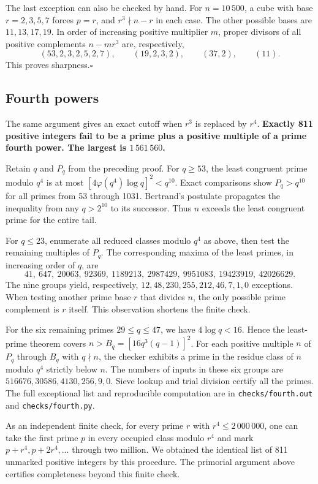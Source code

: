 The last exception can also be checked by hand. For $n=10\,500$, a cube with base $r=2,3,5,7$ forces $p=r$, and $r^3\nmid n-r$ in each case. The other possible bases are $11,13,17,19$. In order of increasing positive multiplier $m$, proper divisors of all positive complements $n-mr^3$ are, respectively,
\[
(53,2,3,2,5,2,7),\qquad(19,2,3,2),\qquad(37,2),\qquad(11).
\]
This proves sharpness.\hfill$\square$
\subsection*{Fourth powers}
The same argument gives an exact cutoff when $r^3$ is replaced by $r^4$.
\textbf{Exactly 811 positive integers fail to be a prime plus a positive multiple of a prime fourth power. The largest is $1\,561\,560$.}

Retain $q$ and $P_q$ from the preceding proof. For $q\ge53$, the least congruent prime modulo $q^4$ is at most $[4\varphi(q^4)\log q]^2<q^{10}$. Exact comparisons show $P_q>q^{10}$ for all primes from 53 through 1031. Bertrand's postulate propagates the inequality from any $q>2^{10}$ to its successor. Thus $n$ exceeds the least congruent prime for the entire tail.

For $q\le23$, enumerate all reduced classes modulo $q^4$ as above, then test the remaining multiples of $P_q$. The corresponding maxima of the least primes, in increasing order of $q$, are
\[
 41,\ 647,\ 20063,\ 92369,\ 1189213,\ 2987429,\ 9951083,\ 19423919,\ 42026629.
\]
The nine groups yield, respectively, $12,48,230,255,212,46,7,1,0$ exceptions. When testing another prime base $r$ that divides $n$, the only possible prime complement is $r$ itself. This observation shortens the finite check.

For the six remaining primes $29\le q\le47$, we have $4\log q<16$. Hence the least-prime theorem covers $n>B_q=[16q^3(q-1)]^2$. For each positive multiple $n$ of $P_q$ through $B_q$ with $q\nmid n$, the checker exhibits a prime in the residue class of $n$ modulo $q^4$ strictly below $n$. The numbers of inputs in these six groups are $516676,30586,4130,256,9,0$. Sieve lookup and trial division certify all the primes. The full exceptional list and reproducible computation are in \texttt{checks/fourth.out} and \texttt{checks/fourth.py}.

As an independent finite check, for every prime $r$ with $r^4\le2\,000\,000$, one can take the first prime $p$ in every occupied class modulo $r^4$ and mark $p+r^4,p+2r^4,\ldots$ through two million. We obtained the identical list of 811 unmarked positive integers by this procedure. The primorial argument above certifies completeness beyond this finite check.

